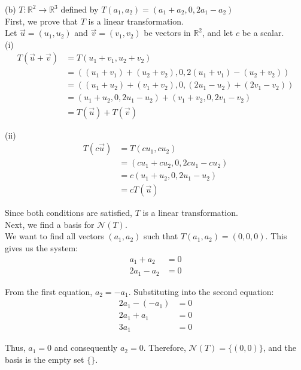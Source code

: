 \documentclass{article}
\begin{document}
(b) $T : \mathbb{R}^2 \to \mathbb{R}^3$ defined by $T(a_1, a_2) = (a_1 + a_2, 0, 2a_1 - a_2)$ \\

First, we prove that $T$ is a linear transformation. \\

Let $\vec{u} = (u_1, u_2)$ and $\vec{v} = (v_1, v_2)$ be vectors in $\mathbb{R}^2$, and let $c$ be a scalar. \\

(i)
\begin{align*}
    T(\vec{u} + \vec{v}) &= T(u_1 + v_1, u_2 + v_2) \\
    &= ((u_1 + v_1) + (u_2 + v_2), 0, 2(u_1 + v_1) - (u_2 + v_2)) \\
    &= ((u_1 + u_2) + (v_1 + v_2), 0, (2u_1 - u_2) + (2v_1 - v_2)) \\
    &= (u_1 + u_2, 0, 2u_1 - u_2) + (v_1 + v_2, 0, 2v_1 - v_2) \\
    &= T(\vec{u}) + T(\vec{v})
\end{align*}

(ii)
\begin{align*}
    T(c\vec{u}) &= T(cu_1, cu_2) \\
    &= (cu_1 + cu_2, 0, 2cu_1 - cu_2) \\
    &= c(u_1 + u_2, 0, 2u_1 - u_2) \\
    &= cT(\vec{u})
\end{align*}

Since both conditions are satisfied, $T$ is a linear transformation. \\

Next, we find a basis for $\mathcal{N}(T)$. \\

We want to find all vectors $(a_1, a_2)$ such that $T(a_1, a_2) = (0, 0, 0)$.
This gives us the system:
\begin{align*}
a_1 + a_2 &= 0\\
2a_1 - a_2 &= 0
\end{align*}

From the first equation, $a_2 = -a_1$. Substituting into the second equation:
\begin{align*}
2a_1 - (-a_1) &= 0\\
2a_1 + a_1 &= 0\\
3a_1 &= 0
\end{align*}

Thus, $a_1 = 0$ and consequently $a_2 = 0$.
Therefore, $\mathcal{N}(T) = \{(0,0)\}$, and the basis is the empty set $\{\}$. \\
\end{document}
